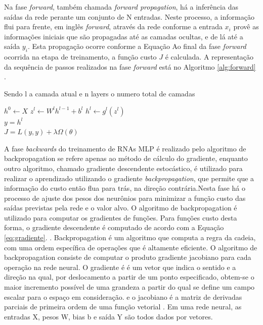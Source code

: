 Na fase \emph{forward}, também chamada \emph{forward propagation}, há a inferência das saídas da rede perante um conjunto de N entradas. Neste processo, a informação flui para frente, em inglês \emph{forward}, através da rede conforme a entrada $x_i$ provê as informações iniciais que são propagadas até as camadas ocultas, e de lá até a saída $y_i$. Esta propagação ocorre conforme a Equação  Ao final da fase \emph{forward} ocorrida na etapa de treinamento, a função custo $J$ é calculada. A representação da sequência de passos realizados na fase \emph{forward} está no Algoritmo \ref{alg:forward} \cite{haykin2009neural, goodfellow2016deep}.

Sendo l a camada atual e n layers o numero total de camadas

\begin{algorithm}\label{alg:forward}
\begin{algorithmic}
	\State $h^0\gets X$
		\State $z^l \gets W^l h^{l-1} + b^l$
		\State $h^l \gets g^l(z^l)$
	\EndFor\\
	$y = h^l$\\
	$J = L(y, y) + \lambda \Omega(\theta)$
\end{algorithmic}
\end{algorithm}

A fase \emph{backwards} do treinamento de RNAs MLP é realizado pelo algoritmo de backpropagation se refere apenas ao método de cálculo do gradiente, enquanto outro algoritmo, chamado gradiente descendente estocástico, é utilizado para realizar o aprendizado utilizando o gradiente \emph{backpropagation}, que permite que a informação do custo então flua para trás, na direção contrária.Nesta fase há o processo de ajuste dos pesos dos neurônios para minimizar a função custo das saídas previstas pela rede e o valor alvo. O algoritmo de backpropagation é utilizado para computar os gradientes de funções. Para funções custo desta forma, o gradiente descendente é computado de acordo com a Equação \ref{eq:gradiente}. .
Backpropagation é um algoritmo que computa a regra da cadeia, com uma ordem específica de operações que é altamente eficiente. O algoritmo de backpropagation consiste de computar o produto gradiente jacobiano para cada operação na rede neural. O gradiente é é um vetor que indica o sentido e a direção na qual, por deslocamento a partir de um ponto especificado, obtem-se o maior incremento possível de uma grandeza a partir do qual se define um campo escalar para o espaço em consideração. e o jacobiano é a matriz de derivadas parciais de primeira ordem de uma função vetorial . Em uma rede neural, as entradas X, pesos W, bias b e saída Y são todos dados por vetores.

